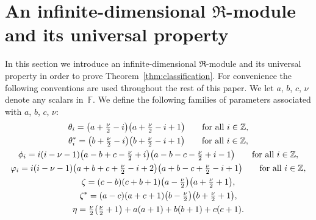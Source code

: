 \documentclass[11pt]{article}
\numberwithin{equation}{section}
\def\F{\mathbb F}
\def\Z{\mathbb Z}
\numberwithin{equation}{section}
\begin{document}
\section[An infinite-dimensional $\Re$-module and its universal property]{An infinite-dimensional $\boldsymbol{\Re}$-module and its universal property}\label{s:Verma}

In this section we introduce an infinite-dimensional $\Re$-module and its universal property in order to prove Theorem~\ref{thm:classification}. For convenience the following conventions are used throughout the rest of this paper. We let $a$, $b$, $c$, $\nu$ denote any scalars in~$\F$. We define the following families of parameters associated with $a$, $b$, $c$, $\nu$:
\begin{gather}
\theta_i =\big(a+\textstyle\frac{\nu}{2}-i\big)\big(a+\textstyle\frac{\nu}{2}-i+1\big)\qquad \hbox{for all $i\in \Z$}, \label{theta_i}\\
\theta^*_i=\big(b+\textstyle\frac{\nu}{2}-i\big)\big(b+\textstyle\frac{\nu}{2}-i+1\big)\qquad\hbox{for all $i\in \Z$}, \label{theta_is}\\
\phi_i=i(i-\nu-1)\big(a-b+c-\textstyle\frac{\nu}{2}+i\big)\big(a-b-c-\textstyle\frac{\nu}{2}+i-1\big)\qquad
\hbox{for all $i\in \Z$},\label{phi_i}\\
\varphi_i=i(i-\nu-1)\big(a+b+c+\textstyle\frac{\nu}{2}-i+2\big)\big(a+b-c+\textstyle\frac{\nu}{2}-i+1\big)
\qquad\hbox{for all $i\in \Z$},\label{varphi_i}\\
\zeta=(c-b)(c+b+1)\big(a-\textstyle\frac{\nu}{2}\big)\big(a+\textstyle\frac{\nu}{2}+1\big),\label{omega}\\
\zeta^*=(a-c)(a+c+1)\big(b-\textstyle\frac{\nu}{2}\big)\big(b+\textstyle\frac{\nu}{2}+1\big),\label{omages}\\
\eta=\textstyle\frac{\nu}{2} \big(\textstyle\frac{\nu}{2}+1\big)+a(a+1)+b(b+1)+c(c+1).\label{eta}
\end{gather}
\end{document}
